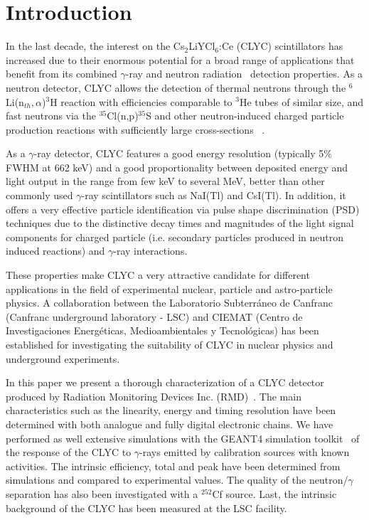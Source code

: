 \documentclass[review,number,sort&compress]{elsarticle}
\begin{document}

\section{Introduction}

In the last decade, the interest on the Cs$_{2}$LiYCl$_{6}$:Ce (CLYC) scintillators has increased due to their enormous potential for a broad range of applications that benefit from its combined $\gamma$-ray and neutron radiation~\cite{Glo1,Bud,McD} detection properties. As a neutron detector, CLYC allows the detection of thermal neutrons through the $^{6}$Li(n$_{th},\alpha$)$^{3}$H reaction with efficiencies comparable to $^{3}$He tubes of similar size, and fast neutrons via the $^{35}$Cl(n,p)$^{35}$S and other neutron-induced charged particle production reactions with sufficiently large cross-sections ~\cite{Oly1, Smi}.

As a $\gamma$-ray detector, CLYC features a good energy resolution (typically 5$\%$ FWHM at 662 keV) and a good proportionality between deposited energy and light output in the range from few keV to several MeV, better than other commonly used $\gamma$-ray scintillators such as NaI(Tl) and CsI(Tl). In addition, it offers a very effective particle identification via pulse shape discrimination (PSD) techniques due to the distinctive decay times and magnitudes of the light signal components for charged particle (i.e. secondary particles produced in neutron induced reactions) and $\gamma$-ray interactions.

These properties make CLYC a very attractive candidate for different applications in the field of experimental nuclear, particle and astro-particle physics. A collaboration between the Laboratorio Subterr\'{a}neo de Canfranc (Canfranc underground laboratory - LSC) and CIEMAT (Centro de Investigaciones Energ\'{e}ticas, Medioambientales y Tecnol\'{o}gicas) has been established for investigating the suitability of CLYC in nuclear physics and underground experiments.

In this paper we present a thorough characterization of a CLYC detector produced by Radiation Monitoring Devices Inc. (RMD)~\cite{RMD}. The main characteristics such as the linearity, energy and timing resolution have been determined with both analogue and fully digital electronic chains. We have performed as well extensive simulations with the GEANT4 simulation toolkit~\cite{Ago} of the response of the CLYC to $\gamma$-rays emitted by calibration sources with known activities. The intrinsic efficiency, total and peak have been determined from simulations and compared to experimental values. The quality of the neutron/$\gamma$ separation has also been investigated with a $^{252}$Cf source. Last, the intrinsic background of the CLYC has been measured at the LSC facility.
\end{document}
